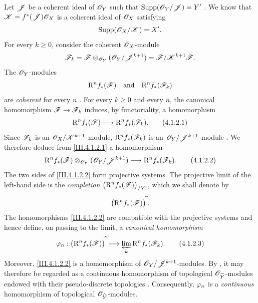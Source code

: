 \begin{env}[4.1.2]
\label{III.4.1.2}
Let $\mathscr{J}$ be a coherent ideal of $\mathscr{O}_Y$ such that $\operatorname{Supp}(\mathscr{O}_Y/\mathscr{J})=Y'$
.
We know  that $\mathscr{K}=f^*(\mathscr{J})\mathscr{O}_X$
is a coherent ideal of $\mathscr{O}_X$ satisfying
\[
  \operatorname{Supp}(\mathscr{O}_X/\mathscr{K})=X'.
\]
For every $k\geq0$, consider the coherent $\mathscr{O}_X$-module
\[
  \mathscr{F}_k
  =
  \mathscr{F}\otimes_{\mathscr{O}_Y}(\mathscr{O}_Y/\mathscr{J}^{k+1})
  =
  \mathscr{F}/\mathscr{K}^{k+1}\mathscr{F}.
\]
The $\mathscr{O}_Y$-modules
\[
  \mathrm{R}^n f_*(\mathscr{F})
  \quad\text{and}\quad
  \mathrm{R}^n f_*(\mathscr{F}_k)
\]
are \emph{coherent} for every $n$ .
For every $k\geq0$ and every $n$, the canonical homomorphism
$\mathscr{F}\to\mathscr{F}_k$ induces, by functoriality, a homomorphism
\[
  \mathrm{R}^n f_*(\mathscr{F})
  \longrightarrow
  \mathrm{R}^n f_*(\mathscr{F}_k).
  \tag{4.1.2.1}
  \label{III.4.1.2.1}
\]
Since $\mathscr{F}_k$ is an $\mathscr{O}_X/\mathscr{K}^{k+1}$-module,
$\mathrm{R}^n f_*(\mathscr{F}_k)$ is an
$\mathscr{O}_Y/\mathscr{J}^{k+1}$-module .
We therefore deduce from \eqref{III.4.1.2.1} a homomorphism
\[
  \mathrm{R}^n f_*(\mathscr{F})
  \otimes_{\mathscr{O}_Y}(\mathscr{O}_Y/\mathscr{J}^{k+1})
  \longrightarrow
  \mathrm{R}^n f_*(\mathscr{F}_k).
  \tag{4.1.2.2}
  \label{III.4.1.2.2}
\]
The two sides of \eqref{III.4.1.2.2} form projective systems.
The projective limit of the left-hand side is the \emph{completion} $\bigl(\mathrm{R}^n f_*(\mathscr{F})\bigr)_{/Y'}$,
which we shall denote by
\[
  \bigl(\mathrm{R}^n f_*(\mathscr{F})\bigr)^{\widehat{\,}}.
\]
The homomorphisms \eqref{III.4.1.2.2} are compatible with the projective
systems and hence define, on passing to the limit, a \emph{canonical
homomorphism}
\[
  \varphi_n:
  \bigl(\mathrm{R}^n f_*(\mathscr{F})\bigr)^{\widehat{\,}}
  \longrightarrow
  \varprojlim_k\mathrm{R}^n f_*(\mathscr{F}_k).
  \tag{4.1.2.3}
  \label{III.4.1.2.3}
\]
Moreover, \eqref{III.4.1.2.2} is a homomorphism of
$\mathscr{O}_Y/\mathscr{J}^{k+1}$-modules.
By , it may therefore be regarded as a continuous
homomorphism of topological $\mathscr{O}_{\widehat{Y}}$-modules endowed with
their pseudo-discrete topologies .
Consequently, $\varphi_n$ is a \emph{continuous} homomorphism of topological
$\mathscr{O}_{\widehat{Y}}$-modules.
\end{env}


